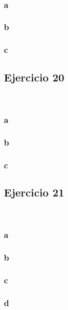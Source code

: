\documentclass{article}
\begin{document}
\

\subsubsection*{a}

\subsubsection*{b}

\subsubsection*{c}

\subsection*{Ejercicio 20}

\

\subsubsection*{a}

\subsubsection*{b}

\subsubsection*{c}

\subsection*{Ejercicio 21}

\

\subsubsection*{a}

\subsubsection*{b}

\subsubsection*{c}

\subsubsection*{d}
\end{document}

